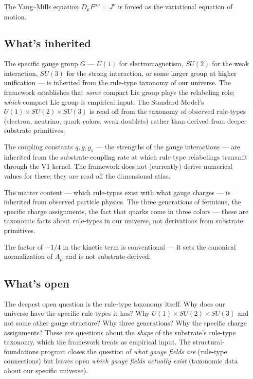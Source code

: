 \documentclass[11pt,a4paper]{article}
\begin{document}
The Yang--Mills equation $D_\mu F^{\mu\nu} = J^\nu$ is forced as the variational equation of motion.

\subsection{What's inherited}

The specific gauge group $G$ --- $U(1)$ for electromagnetism, $SU(2)$ for the weak interaction, $SU(3)$ for the strong interaction, or some larger group at higher unification --- is inherited from the rule-type taxonomy of our universe. The framework establishes that \emph{some} compact Lie group plays the relabeling role; \emph{which} compact Lie group is empirical input. The Standard Model's $U(1) \times SU(2) \times SU(3)$ is read off from the taxonomy of observed rule-types (electron, neutrino, quark colors, weak doublets) rather than derived from deeper substrate primitives.

The coupling constants $q, g, g_s$ --- the strengths of the gauge interactions --- are inherited from the substrate-coupling rate at which rule-type relabelings transmit through the V1 kernel. The framework does not (currently) derive numerical values for these; they are read off the dimensional atlas.

The matter content --- which rule-types exist with what gauge charges --- is inherited from observed particle physics. The three generations of fermions, the specific charge assignments, the fact that quarks come in three colors --- these are taxonomic facts about rule-types in our universe, not derivations from substrate primitives.

The factor of $-1/4$ in the kinetic term is conventional --- it sets the canonical normalization of $A_\mu$ and is not substrate-derived.

\subsection{What's open}

The deepest open question is the rule-type taxonomy itself. Why does our universe have the specific rule-types it has? Why $U(1) \times SU(2) \times SU(3)$ and not some other gauge structure? Why three generations? Why the specific charge assignments? These are questions about the \emph{shape} of the substrate's rule-type taxonomy, which the framework treats as empirical input. The structural-foundations program closes the question of \emph{what gauge fields are} (rule-type connections) but leaves open \emph{which gauge fields actually exist} (taxonomic data about our specific universe).
\end{document}
